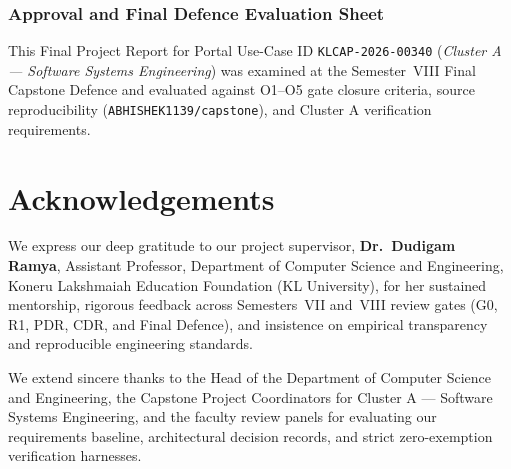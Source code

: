 \subsection*{Approval and Final Defence Evaluation Sheet}
This Final Project Report for Portal Use-Case ID \texttt{KLCAP-2026-00340} (\emph{Cluster A --- Software Systems Engineering}) was examined at the Semester~VIII Final Capstone Defence and evaluated against O1--O5 gate closure criteria, source reproducibility (\texttt{ABHISHEK1139/\protect\allowbreak{}capstone}), and Cluster A verification requirements.

\begin{center}
\fontsize{9.5}{12.5}\selectfont
{}
\end{center}

\newpage
\chapter*{Acknowledgements}

We express our deep gratitude to our project supervisor, \textbf{Dr.~Dudigam Ramya}, Assistant Professor, Department of Computer Science and Engineering, Koneru Lakshmaiah Education Foundation (KL University), for her sustained mentorship, rigorous feedback across Semesters~VII and~VIII review gates (G0, R1, PDR, CDR, and Final Defence), and insistence on empirical transparency and reproducible engineering standards.

We extend sincere thanks to the Head of the Department of Computer Science and Engineering, the Capstone Project Coordinators for Cluster A --- Software Systems Engineering, and the faculty review panels for evaluating our requirements baseline, architectural decision records, and strict zero-exemption verification harnesses.

